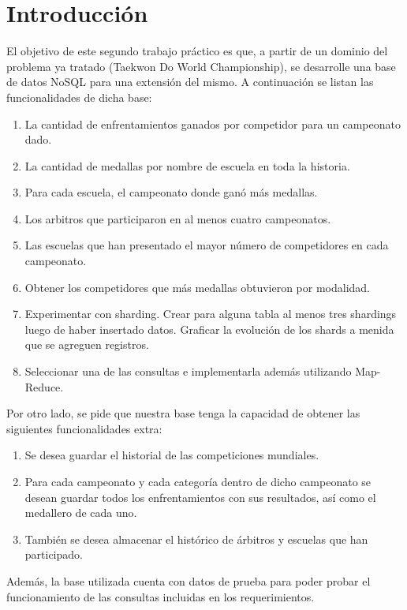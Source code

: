 \section{Introducción}

El objetivo de este segundo trabajo práctico es que, a partir de un dominio del problema ya tratado (Taekwon Do World Championship), se desarrolle una base de datos NoSQL para una extensión del mismo. A continuación se listan las funcionalidades de dicha base:

\begin{enumerate}

	\item La cantidad de enfrentamientos ganados por competidor para un campeonato dado.
	\item La cantidad de medallas por nombre de escuela en toda la historia.
	\item Para cada escuela, el campeonato donde ganó más medallas.
	\item Los arbitros que participaron en al menos cuatro campeonatos.
	\item Las escuelas que han presentado el mayor número de competidores en cada campeonato.
	\item Obtener los competidores que más medallas obtuvieron por modalidad.
	\item Experimentar con sharding. Crear para alguna tabla al menos tres shardings luego de haber insertado datos. Graficar la evolución de los shards a menida que se agreguen registros.
	\item Seleccionar una de las consultas e implementarla además utilizando Map-Reduce.
	
\end{enumerate}

Por otro lado, se pide que nuestra base tenga la capacidad de obtener las siguientes funcionalidades extra:

\begin{enumerate}

	\item Se desea guardar el historial de las competiciones mundiales.
	\item Para cada campeonato y cada categoría dentro de dicho campeonato se desean guardar todos los enfrentamientos con sus resultados, así como el medallero de cada uno.
	\item También se desea almacenar el histórico de árbitros y escuelas que han participado.

\end{enumerate}

 Además, la base utilizada cuenta con datos de prueba para poder probar el funcionamiento de las consultas incluidas en los requerimientos.